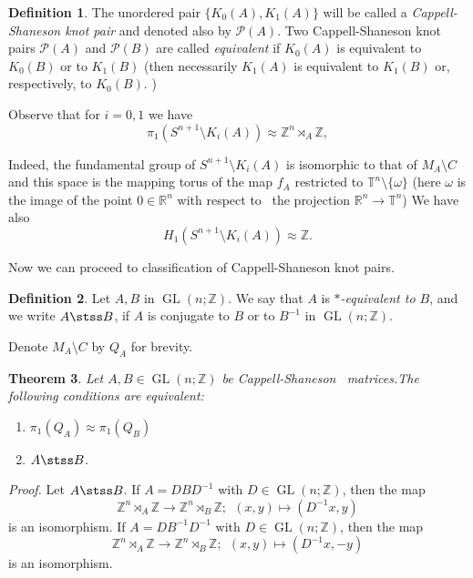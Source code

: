 \documentclass[12pt]{amsart}
\newcommand{\cskp}{Cappell-Shaneson knot pair}
\newcommand{\csss}{Cappell-Shaneson~ }
\theoremstyle{plain}
\newtheorem{theorem}{Theorem}[section]
\theoremstyle{definition}
\newtheorem{definition}[theorem]{Definition}
\theoremstyle{remark}
\newcommand{\rr}{{\mathbb{R}}}
\newcommand{\ttt}{{\mathbb{T}}}
\newcommand{\zz}{{\mathbb{Z}}}
\newcommand{\PPPP}{{\mathscr{P}}}
\newcommand{\been}{\begin{enumerate}}
\newcommand{\enen}{\end{enumerate}}
\newcommand{\sm}{\setminus}
\newcommand{\wrt}{with respect to}
\newcommand{\Prf}{{\it Proof.\quad}}
\renewcommand{\(}{\big(}
\renewcommand{\)}{\big)}
\theoremstyle{plain}
\theoremstyle{definition}
\begin{document}
\begin{definition}\label{d:pairs}
The unordered pair $\{K_0(A),K_1(A)\}$
will be  called a \textit{Cappell-Shaneson knot pair}
and denoted also by $\PPPP(A)$.
Two \cskp s
$\PPPP(A)$ and $\PPPP(B)$
are called {\it equivalent} if
$K_0(A)$ is equivalent to $ K_0(B)$ or to $ K_1(B)$
(then necessarily $K_1(A)$
is equivalent to $ K_1(B)$ or,  respectively, to $ K_0(B)$.
)
\end{definition}

Observe that for $i=0,1$  we have
\begin{equation}
 \label{f:semidir}\pi_1(S^{n+1}\setminus K_i(A))
\approx
\mathbb{Z}^{n}\rtimes_A \mathbb{Z},
\end{equation}


\noindent
Indeed,
the fundamental group of $S^{n+1}\setminus K_i(A)$
is isomorphic to that of $M_A\sm C$ and this space is the mapping torus of the map $f_A$ restricted to $\ttt^{n}\sm \{\omega\}$
(here $\omega$ is the image of the point $0\in\rr^n$ \wrt~
the projection $\rr^n\to\ttt^n$)
We have also
\begin{equation}
 \label{f:hh}
H_1(S^{n+1}\setminus K_i(A))
\approx
\zz.
\end{equation}

\noindent
Now we can proceed to classification of
\cskp s.
\begin{definition}\label{d:star-eq}
    Let $A,B$ in $\operatorname{GL}(n;\mathbb{Z})$.
    We say that $A$ is {\it  $*$-equivalent to $B$},
    and we write $A \stss B$,
    if $A$ is conjugate to $B$ or to $B^{-1}$ in
    $\operatorname{GL}(n;\mathbb{Z})$.
    \end{definition}

Denote $M_A\sm C$ by $Q_A$ for brevity.


\begin{theorem}\label{theorem:semidirect_product_classification}
    Let $A, B\in\operatorname{GL}(n;\mathbb{Z})$
    be \csss matrices.The following conditions are equivalent:
    \been
        \item $\pi_1(Q_A)\approx \pi_1(Q_B)$
        \item $A\stss B$.
    \enen
\end{theorem}
\Prf
Let $A\stss B$. If $A=DBD^{-1}$ with $D \in \operatorname{GL}(n;\mathbb{Z})$, then  the map
$$\mathbb{Z}^{n}\rtimes_A \mathbb{Z} \to  \mathbb{Z}^{n}\rtimes_B \mathbb{Z}; \ \  (x, y) \mapsto (D^{-1}x, y)$$
is an isomorphism.
If $A=DB^{-1}D^{-1}$ with $D \in \operatorname{GL}(n;\mathbb{Z})$, then  the map
$$\mathbb{Z}^{n}\rtimes_A \mathbb{Z} \to  \mathbb{Z}^{n}\rtimes_B \mathbb{Z}; \ \  (x, y) \mapsto (D^{-1}x, -y)$$
is an isomorphism.
\end{document}
